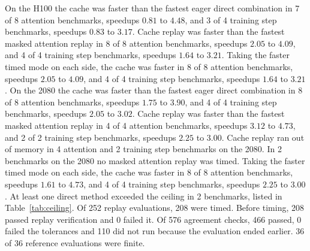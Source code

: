 On the H100 the cache was faster than the fastest eager direct combination in 7 of 8 attention benchmarks, speedups $0.81$ to $4.48$, and 3 of 4 training step benchmarks, speedups $0.83$ to $3.17$. Cache replay was faster than the fastest masked attention replay in 8 of 8 attention benchmarks, speedups $2.05$ to $4.09$, and 4 of 4 training step benchmarks, speedups $1.64$ to $3.21$. Taking the faster timed mode on each side, the cache was faster in 8 of 8 attention benchmarks, speedups $2.05$ to $4.09$, and 4 of 4 training step benchmarks, speedups $1.64$ to $3.21$. On the 2080 the cache was faster than the fastest eager direct combination in 8 of 8 attention benchmarks, speedups $1.75$ to $3.90$, and 4 of 4 training step benchmarks, speedups $2.05$ to $3.02$. Cache replay was faster than the fastest masked attention replay in 4 of 4 attention benchmarks, speedups $3.12$ to $4.73$, and 2 of 2 training step benchmarks, speedups $2.25$ to $3.00$. Cache replay ran out of memory in 4 attention and 2 training step benchmarks on the 2080. In 2 benchmarks on the 2080 no masked attention replay was timed. Taking the faster timed mode on each side, the cache was faster in 8 of 8 attention benchmarks, speedups $1.61$ to $4.73$, and 4 of 4 training step benchmarks, speedups $2.25$ to $3.00$. At least one direct method exceeded the ceiling in 2 benchmarks, listed in Table~\ref{tab:ceiling}. Of 252 replay evaluations, 208 were timed. Before timing, 208 passed replay verification and 0 failed it. Of 576 agreement checks, 466 passed, 0 failed the tolerances and 110 did not run because the evaluation ended earlier. 36 of 36 reference evaluations were finite.